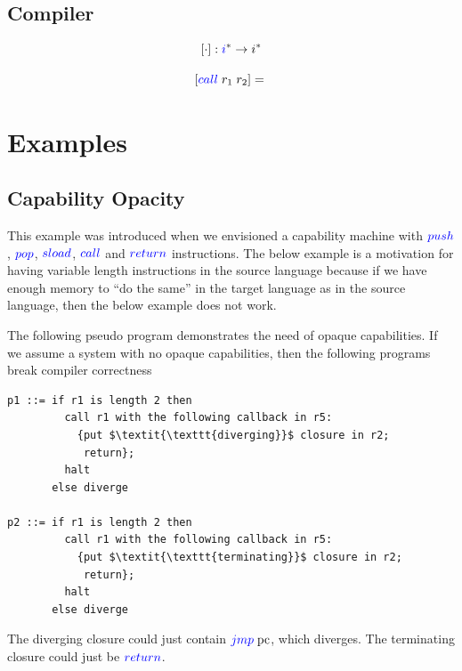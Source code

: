 \documentclass[a4paper]{article}
\newcommand{\fun}{\rightarrow}
\newcommand{\sourcecolor}[1]{\color{blue}}
\newcommand{\src}[1]{{\sourcecolor{} #1}}
\newcommand{\targetcolor}[1]{\color{black}}
\newcommand{\trg}[1]{{\targetcolor{} #1}}
\newcommand{\zinstr}[1]{#1}
\newcommand{\oneinstr}[2]{
  \ifthenelse{\equal{#2}{}}
  {\zinstr{#1}}
  {\zinstr{#1} \; #2}
}
\newcommand{\twoinstr}[3]{
  \ifthenelse{\equal{#2#3}{}}
  {\zinstr{#1}}
  {\zinstr{#1} \; #2 \; #3}
}
\newcommand{\sreturn}{\zinstr{\src{return}}}
\newcommand{\sjmp}[1]{\oneinstr{\src{jmp}}{#1}}
\newcommand{\spush}[1]{\oneinstr{\src{push}}{#1}}
\newcommand{\spop}[1]{\oneinstr{\src{pop}}{#1}}
\newcommand{\ssload}[2]{\twoinstr{\src{sload}}{#1}{#2}}
\newcommand{\scall}[2]{\twoinstr{\src{call}}{#1}{#2}}
\newcommand{\pcreg}{\mathrm{pc}}
\newcommand{\comp}[1]{[#1]}
\begin{document}
\subsection{Compiler}
\[
\comp{\cdot} : \src{i}^* \fun \trg{i}^*
\]

\[
  \comp{\scall{r_1}{r_2}} = 
  \begin{array}[t]{l}
  \end{array}
\]

\clearpage
\section{Examples}
\subsection{Capability Opacity}
\label{subsec:capability-opacity}
This example was introduced when we envisioned a capability machine with $\spush{}$, $\spop{}$, $\ssload{}{}$, $\scall{}{}$ and $\sreturn$ instructions. The below example is a motivation for having variable length instructions in the source language because if we have enough memory to ``do the same'' in the target language as in the source language, then the below example does not work.

The following pseudo program demonstrates the need of opaque capabilities. If we assume a system with no opaque capabilities, then the following programs break compiler correctness
\begin{lstlisting}[basicstyle=\sourcecolor{}\ttfamily] 
p1 ::= if r1 is length 2 then
         call r1 with the following callback in r5:
           {put $\textit{\texttt{diverging}}$ closure in r2;
            return};
         halt
       else diverge

p2 ::= if r1 is length 2 then
         call r1 with the following callback in r5:
           {put $\textit{\texttt{terminating}}$ closure in r2;
            return};
         halt
       else diverge
\end{lstlisting}
The diverging closure could just contain $\sjmp{\pcreg}$, which diverges. The terminating closure could just be $\sreturn$.
\end{document}
